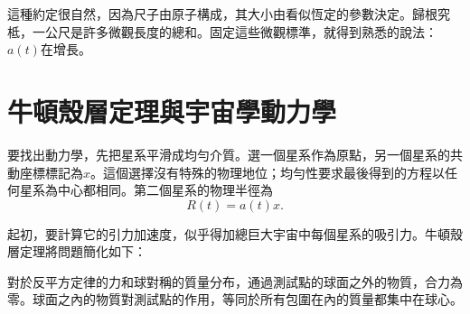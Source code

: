 \begin{classroomqa}
\end{classroomqa}

這種約定很自然，因為尺子由原子構成，其大小由看似恆定的參數決定。歸根究柢，一公尺是許多微觀長度的總和。固定這些微觀標準，就得到熟悉的說法：\(a(t)\)在增長。

\begin{classroomqa}
\end{classroomqa}

\begin{classroomqa}
\end{classroomqa}

\section{牛頓殼層定理與宇宙學動力學}

要找出動力學，先把星系平滑成均勻介質。選一個星系作為原點，另一個星系的共動座標標記為\(x\)。這個選擇沒有特殊的物理地位；均勻性要求最後得到的方程以任何星系為中心都相同。第二個星系的物理半徑為
\begin{equation}
  R(t)=a(t)x.
  \label{eq:radius-ax}
\end{equation}

起初，要計算它的引力加速度，似乎得加總巨大宇宙中每個星系的吸引力。牛頓殼層定理將問題簡化如下：

\begin{proposition}
對於反平方定律的力和球對稱的質量分布，通過測試點的球面之外的物質，合力為零。球面之內的物質對測試點的作用，等同於所有包圍在內的質量都集中在球心。
\end{proposition}

